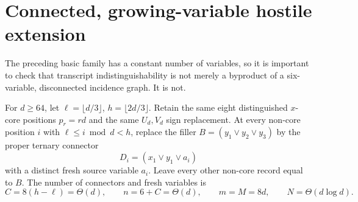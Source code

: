\documentclass[11pt]{article}
\begin{document}
\section{Connected, growing-variable hostile extension}
The preceding basic family has a constant number of variables, so it is important to check that transcript indistinguishability is not merely a byproduct of a six-variable, disconnected incidence graph. It is not.

For \(d\ge64\), let \(\ell=\lfloor d/3\rfloor\), \(h=\lfloor2d/3\rfloor\). Retain the same eight distinguished \(x\)-core positions \(p_r=rd\) and the same \(U_d,V_d\) sign replacement. At every non-core position \(i\) with
\(\ell\le i\bmod d<h\), replace the filler \(B=(y_1\vee y_2\vee y_3)\) by the proper ternary connector
\[
D_i=(x_1\vee y_1\vee a_i)
\]
with a distinct fresh source variable \(a_i\). Leave every other non-core record equal to \(B\).
The number of connectors and fresh variables is
\[
C=8(h-\ell)=\Theta(d),\qquad
n=6+C=\Theta(d),\qquad m=M=8d,\qquad N=\Theta(d\log d).
\]
\end{document}
